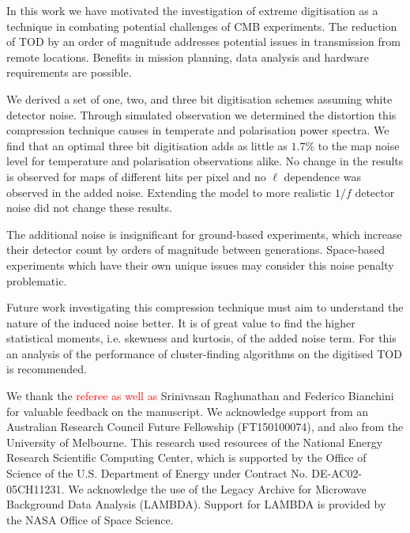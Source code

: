 \documentclass[apj]{emulateapj}
\newcommand{\changed}[1]{\textcolor{Red}{#1}}
\begin{document}
In this work we have motivated the investigation of extreme digitisation as a technique in combating potential challenges of CMB experiments. The reduction of TOD by an order of magnitude addresses potential issues in transmission from remote locations. Benefits in mission planning, data analysis and hardware requirements are possible.

We derived a set of one, two, and three bit digitisation schemes assuming white detector noise. Through simulated observation we determined the distortion this compression technique causes in temperate and polarisation power spectra. We find that an optimal three bit digitisation adds as little as $1.7\%$ to the map noise level for temperature and polarisation observations alike. No change in the results is observed for maps of different hits per pixel and no $\ell$ dependence was observed in the added noise. Extending the model to more realistic $1/f$ detector noise did not change these results.

The additional noise is insignificant for ground-based experiments, which increase their detector count by orders of magnitude between generations. Space-based experiments which have their own unique issues may consider this noise penalty problematic.

Future work investigating this compression technique must aim to understand the nature of the induced noise better. It is of great value to find the higher statistical moments, i.e. skewness and kurtosis, of the added noise term. For this an analysis of the performance of cluster-finding algorithms on the digitised TOD is recommended.

\acknowledgments %


We thank the \changed{referee as well as} Srinivasan Raghunathan and Federico Bianchini for valuable feedback on the manuscript. 
We acknowledge support from an Australian Research Council Future Fellowship (FT150100074), and also from the University of Melbourne. 
This research used resources of the National Energy Research Scientific Computing Center, which is supported by the Office of Science of the U.S. Department of Energy under Contract No. DE-AC02-05CH11231. 
We acknowledge the use of the Legacy Archive for Microwave Background Data Analysis (LAMBDA). Support for LAMBDA is provided by the NASA Office of Space Science.

\end{document}
